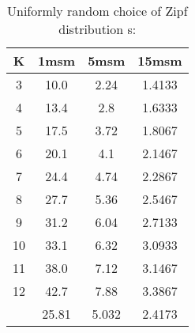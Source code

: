 \begin{table}[H]
\centering
\begin{tabular}{c|ccc}
K &1msm &5msm &15msm\\
\hline
3 & 10.0 & 2.24 & 1.4133\\
4 & 13.4 & 2.8 & 1.6333\\
5 & 17.5 & 3.72 & 1.8067\\
6 & 20.1 & 4.1 & 2.1467\\
7 & 24.4 & 4.74 & 2.2867\\
8 & 27.7 & 5.36 & 2.5467\\
9 & 31.2 & 6.04 & 2.7133\\
10 & 33.1 & 6.32 & 3.0933\\
11 & 38.0 & 7.12 & 3.1467\\
12 & 42.7 & 7.88 & 3.3867\\
\hline
& 25.81 & 5.032 & 2.4173\\
\end{tabular}
\caption{Uniformly random choice of Zipf distribution s:}
\label{tab:s1.4}
\end{table}
